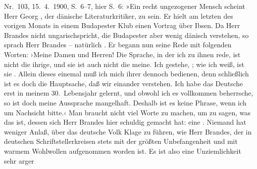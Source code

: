 \begin{ledgroupsized}[t]{13cm}
{{{                     Nr. 103, 15. 4. 1900, S. 6–7, hier S. 6: »Ein recht
                     ungezogener Mensch scheint Herr Georg , der dänische Literaturkritiker, zu
                     sein. Er hielt am letzten des vorigen Monats in einem Budapester Klub einen Vortrag über
                        Ibsen. Da Herr Brandes nicht ungarischspricht, die Budapester aber wenig dänisch
                     verstehen, so sprach Herr Brandes –
                     natürlich . Er begann nun seine Rede mit
                     folgenden Worten: ›Meine Damen und Herren! Die Sprache, in der ich zu ihnen
                     rede, ist nicht die ihrige, und sie ist auch nicht die meine. Ich gestehe, ; wie
                     ich weiß, ist sie .
                     Allein dieses einemal muß ich mich ihrer dennoch bedienen, denn schließlich ist
                     es doch die Hauptsache, daß wir einander verstehen. Ich habe das Deutsche erst
                     in meinem 30. Lebensjahr gelernt, und obwohl ich es vollkommen beherrsche, so
                     ist doch meine Aussprache mangelhaft. Deshalb ist es keine Phrase, wenn ich um
                     Nachsicht bitte.‹ Man braucht nicht viel Worte zu machen, um zu sagen, was das
                     ist, dessen sich Herr Brandes hier
                     schuldig gemacht hat: eine . Niemand
                     hat weniger Anlaß, über das deutsche Volk Klage zu führen, wie Herr Brandes, der in deutschen
                     Schriftstellerkreisen stets mit der größten Unbefangenheit und mit warmem
                     Wohlwollen aufgenommen worden ist. Es ist also eine Unziemlichkeit sehr arger
}}}
\end{ledgroupsized}
